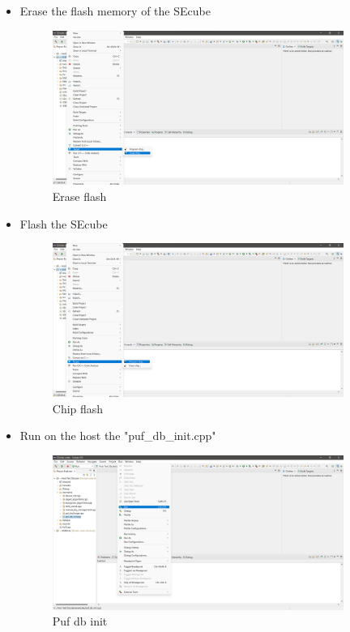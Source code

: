 \begin{itemize}
\item {Erase the flash memory of the SEcube}

\begin{figure}[H]
\centering
  \includegraphics[width=9.5cm]{../../images/erase_flash.png}
  \caption{Erase flash}
  \label{fig:Erase flash}
\end{figure}

\item {Flash the SEcube}
\begin{figure}[H]
\centering
  \includegraphics[width=9.5cm]{../../images/chip_flash.png}
  \caption{Chip flash}
  \label{fig:Chip flash}
\end{figure}


\item {Run on the host the "puf\_db\_init.cpp"}
\begin{figure}[H]
\centering
  \includegraphics[width=9.5cm]{../../images/puf_db_init.png}
  \caption{Puf db init}
  \label{fig:Puf db init}
\end{figure}


\end{itemize}
